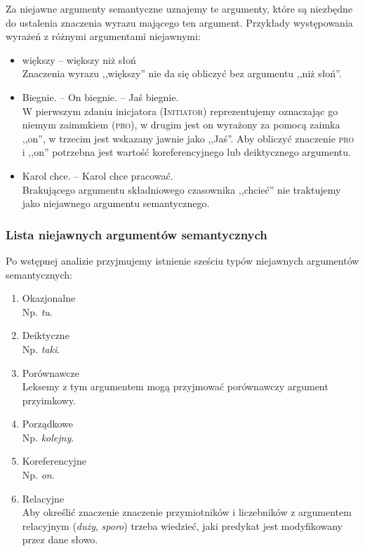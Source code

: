 \documentclass[a4paper, 12pt]{article}
\theoremstyle{remark}
\begin{document}
Za niejawne argumenty semantyczne uznajemy te argumenty, które są niezbędne do ustalenia znaczenia wyrazu mającego ten argument.
Przykłady występowania wyrażeń z różnymi argumentami niejawnymi:
\begin{itemize}
	\item większy -- większy niż słoń \\ Znaczenia wyrazu ,,większy'' nie da się obliczyć bez argumentu ,,niż słoń''.
	\item Biegnie. -- On biegnie. -- Jaś biegnie. \\
	W pierwszym zdaniu inicjatora (\textsc{Initiator}) reprezentujemy oznaczając go niemym zaimmkiem (\textsc{pro}), w drugim jest on wyrażony za pomocą zaimka ,,on'', w trzecim jest wskazany jawnie jako ,,Jaś''.
	Aby obliczyć znaczenie \textsc{pro} i ,,on'' potrzebna jest wartość koreferencyjnego lub deiktycznego argumentu.
	\item Karol chce. -- Karol chce pracować.\\
	Brakującego argumentu składniowego czasownika ,,chcieć'' nie traktujemy jako niejawnego argumentu semantycznego.
\end{itemize}

\subsubsection{Lista niejawnych argumentów semantycznych} %
\label{niejawne}
Po wstępnej analizie przyjmujemy istnienie sześciu typów niejawnych argumentów semantycznych:

\begin{enumerate}
\item Okazjonalne \\ Np. \emph{tu}.
\item Deiktyczne\\ Np. \emph{taki}.
\item Porównawcze \\ Leksemy z tym argumentem mogą przyjmować porównawczy argument przyimkowy.
\item Porządkowe \\ Np. \emph{kolejny}.
\item Koreferencyjne \\ Np. \emph{on}.
\item Relacyjne \\ Aby określić znaczenie znaczenie przymiotników i liczebników z argumentem relacyjnym (\emph{duży}, \emph{sporo}) trzeba wiedzieć, jaki predykat jest modyfikowany przez dane słowo.
\label{relac}
\end{enumerate}
\end{document}
